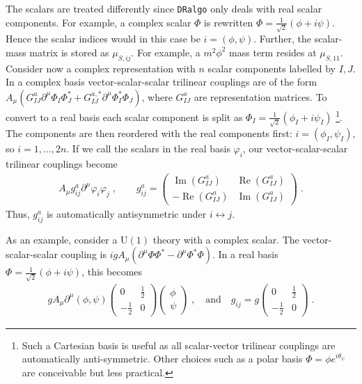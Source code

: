 \documentclass[11pt]{article}
\def\dralgo{{\tt DRalgo}}
\newcommand{\re}{\mathop{\mbox{Re}}}
\newcommand{\im}{\mathop{\mbox{Im}}}
\begin{document}
The scalars are treated differently since
\dralgo{} only deals with real scalar components.
For example, a complex scalar $\Phi$ is rewritten
$\Phi=\frac{1}{\sqrt{2}}\left(\phi +i \psi\right)$.
Hence the scalar indices would in this case be $i=(\phi,\psi)$. Further, the scalar-mass matrix is stored as $\mu_{S,ij}$.
For example, a $m^2 \phi^2$ mass term resides at $\mu_{S,11}$.
Consider now a complex representation with $n$ scalar components
labelled by $I,J$.
In a complex basis vector-scalar-scalar trilinear couplings are of the form
$
A_\mu \left(G_{IJ}^{a}\partial^{\mu}\Phi_{I}^{ } \Phi_{J}^{*}
+ G^{a,*}_{IJ}\partial^{\mu}\Phi_{I}^{*} \Phi_{J}^{ }\right)$,
where $G^a_{IJ}$ are representation matrices.
To convert to a real basis each scalar component is split as
$\Phi_I=\frac{1}{\sqrt{2}}\left(\phi_I + i \psi_I\right)$%
\footnote{%
  Such a Cartesian basis is useful as all scalar-vector trilinear couplings
  are automatically anti-symmetric.
  Other choices such as a polar basis $\Phi = \phi e^{i\theta_\psi}$ are conceivable but less practical.
}.
The components are then reordered with the real components first:
$i=(\phi_I,\psi_I)$, so
$i=1,\ldots,2n$.
If we call the scalars in the real basis $\varphi_i$,
our vector-scalar-scalar trilinear couplings become
\begin{align}
A_\mu^{ } g^a_{ij}\partial^{\mu}\varphi_i^{ } \varphi_j^{ }
\;,\qquad
g_{ij}^a=
\begin{pmatrix}
    \im(G^a_{IJ}) &
    \re(G^a_{IJ}) \\
  - \re(G^a_{IJ}) &
    \im(G^a_{IJ})
\end{pmatrix}
\;.
\end{align}
Thus,
$g^a_{ij}$ is automatically antisymmetric under $i\leftrightarrow j$.

As an example,
consider a $\mathrm{U}(1)$ theory with
a complex scalar.
The vector-scalar-scalar coupling is
$
i  g A_\mu \left(\partial^\mu \Phi \Phi^{*}-\partial^\mu \Phi^{*} \Phi \right)
$.
In a real basis
$\Phi=\frac{1}{\sqrt{2}}\left(\phi+ i \psi\right) $,
this becomes 
\begin{align}
g A_{\mu}\partial^{\mu}\left(\phi,\psi\right)
\begin{pmatrix}
  0 & \frac{1}{2}\\
  -\frac{1}{2} & 0
\end{pmatrix}
\begin{pmatrix}
  \phi\\
  \psi
\end{pmatrix}
\;,\quad
\text{and}
\quad
g_{ij}=g
\begin{pmatrix}
  0 & \frac{1}{2} \\
  - \frac{1}{2} & 0
\end{pmatrix}
\;.
\end{align}
\end{document}
